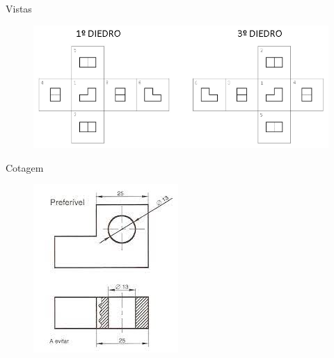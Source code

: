 \documentclass{cubeamer}
\begin{document}
\begin{frame}{Vistas}
    \begin{center}
        \begin{figure}
            \centering
            \includegraphics[height = 0.6\textheight]{img/desenho4.jpg}
            \caption{\cite{diedro:online}}
        \end{figure}
    \end{center}
\end{frame}

\begin{frame}{Cotagem}
    \begin{center}
        \begin{figure}
            \centering
            \includegraphics[height = 0.6\textheight]{img/desenho5.jpeg}
            \caption{\cite{cota:online}}
        \end{figure}
    \end{center}
\end{frame}
\end{document}
